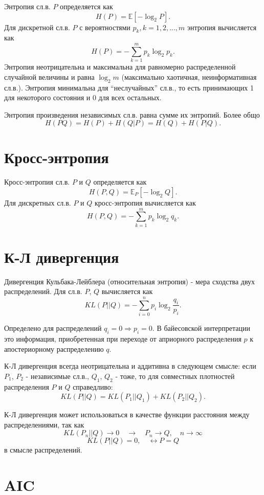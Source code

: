 Энтропия сл.в. $P$ определяется как
$$
H(P) = \mathbb{E}[-\log_2P].
$$
Для дискретной сл.в. $P$ с вероятностями $p_k, k=1, 2, ..., m$ энтропия вычисляется как
$$
H(P) = -\sum_{k=1}^mp_k\log_2p_k.
$$
Энтропия неотрицательна и максимальна для равномерно распределенной случайной величины и равна $\log_2m$ (максимально хаотичная, неинформативная сл.в.). Энтропия минимальна для ``неслучайных'' сл.в., то есть принимающих 1 для некоторого состояния и 0 для всех остальных.

Энтропия произведения независимых сл.в. равна сумме их энтропий. Более общо
$$
H(PQ) = H(P) + H(Q|P) = H(Q) + H(P|Q).
$$


\section{Кросс-энтропия}

Кросс-энтропия сл.в. $P$ и $Q$ определяется как
$$
H(P, Q) = \mathbb{E}_P[-\log_2Q].
$$
Для дискретных сл.в. $P$ и $Q$ кросс-энтропия вычисляется как
$$
H(P, Q) = -\sum_{k=1}^mp_k\log_2q_k.
$$


\section{К-Л дивергенция}

Дивергенция Кульбака-Лейблера (относительная энтропия) - мера сходства двух распределений. Для сл.в. $P$, $Q$ вычисляется как
$$
KL(P||Q) = -\sum_{i=0}^np_i\log_2\frac{q_i}{p_i}.
$$

Определено для распределений $q_i = 0 \Rightarrow p_i=0$.
В байесовской интерпретации это информация, приобретенная при переходе от априорного распределения $p$ к апостериорному распределению $q$.

К-Л дивергенция всегда неотрицательна и аддитивна в следующем смысле: если $P_1$, $P_2$ - независимые сл.в., $Q_1$, $Q_2$ - тоже, то для совместных плотностей распределения $P$ и $Q$ справедливо:
$$
KL(P||Q) =  KL(P_1||Q_1) + KL(P_2||Q_2).
$$

К-Л дивергенция может использоваться в качестве функции расстояния между распределениями, так как
$$
KL(P_n||Q) \rightarrow 0 \quad \rightarrow \quad P_n \rightarrow Q, \quad n \rightarrow \infty
$$
$$
KL(P||Q)=0, \quad \leftrightarrow P = Q
$$
в смысле распределений.


\section{AIC}

